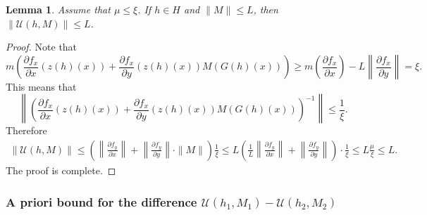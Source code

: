 \documentclass[11pt, leqno]{amsart}
\newtheorem{lem}[thm]{Lemma}
\theoremstyle{definition}
\begin{document}
\begin{lem}\label{lem:res}
  Assume that $\mu\leq \xi$. If $h \in H$ and $\|M\| \leq L$, then $\|\mathcal{U}(h,M)\| \leq L$.
\end{lem}
\begin{proof}
Note that 
\begin{equation}\label{eq:ksi}
m\left(\frac{\partial f_x}{\partial x}(z(h)(x)) + \frac{\partial f_x}{\partial y}(z(h)(x)) M(G(h)(x))\right) \geq m\left(\frac{\partial f_x}{\partial x}\right) - L\left\|\frac{\partial f_x}{\partial y}\right\| = \xi.
\end{equation}
This means that 
\begin{equation}\label{eq:ksi_gie}
\left\|\left(\frac{\partial f_x}{\partial x}(z(h)(x)) + \frac{\partial f_x}{\partial y}(z(h)(x)) M(G(h)(x)) \right)^{-1}\right\| \leq \frac{1}{\xi}. 
\end{equation}
Therefore 
\begin{eqnarray*}
   \|\mathcal{U}(h,M)\| \leq \left( \left\|\frac{\partial f_y}{\partial x} \right\|   +  \left\|\frac{\partial f_y}{\partial y}\right\| \cdot \|M\| \right) \frac{1}{\xi}
   \leq L \left(\frac{1}{L}\left\|\frac{\partial f_y}{\partial x} \right\| + \left\|\frac{\partial f_y}{\partial y}\right\|  \right) \cdot  \frac{1}{\xi} \leq L \frac{\mu}{\xi} \leq L.
\end{eqnarray*}
The proof is complete.
\end{proof}

\subsubsection{A priori bound for the difference  $\mathcal{U}(h_1,M_1)-\mathcal{U}(h_2,M_2)$}
\end{document}
